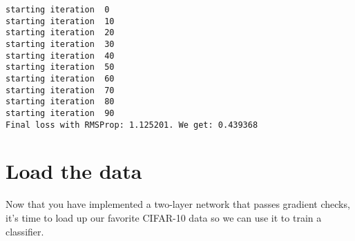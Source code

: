 \documentclass[11pt]{article}
\begin{document}
    \begin{Verbatim}[commandchars=\\\{\}]
starting iteration  0
starting iteration  10
starting iteration  20
starting iteration  30
starting iteration  40
starting iteration  50
starting iteration  60
starting iteration  70
starting iteration  80
starting iteration  90
Final loss with RMSProp: 1.125201. We get: 0.439368

    \end{Verbatim}

    \section{Load the data}\label{load-the-data}

Now that you have implemented a two-layer network that passes gradient
checks, it's time to load up our favorite CIFAR-10 data so we can use it
to train a classifier.
\end{document}

